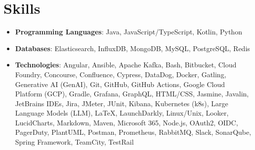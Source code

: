 \documentclass[letterpaper,10pt]{article}
\newcommand{\skills}[2]{\item\small{{\textbf{#1}: #2\vspace{-6pt}}}}
\begin{document}
\section{Skills}
\begin{itemize}[leftmargin=6pt, rightmargin=8pt, label={}]
  \skills{Programming Languages}
    {Java, JavaScript/TypeScript, Kotlin, Python}
  \skills{Databases}
    {Elasticsearch, InfluxDB, MongoDB, MySQL, PostgreSQL, Redis}
  \skills{Technologies}
    {Angular, Ansible, Apache Kafka, Bash, Bitbucket, Cloud Foundry, Concourse, Confluence, Cypress, DataDog, Docker, Gatling, Generative AI (GenAI), Git, GitHub, GitHub Actions, Google Cloud Platform (GCP), Gradle, Grafana, GraphQL, HTML/CSS, Jasmine, Javalin, JetBrains IDEs, Jira, JMeter, JUnit, Kibana, Kubernetes (k8s), Large Language Models (LLM), LaTeX, LaunchDarkly, Linux/Unix, Looker, LucidCharts, Markdown, Maven, Microsoft 365, Node.js, OAuth2, OIDC, PagerDuty, PlantUML, Postman, Prometheus, RabbitMQ, Slack, SonarQube, Spring Framework, TeamCity, TestRail}
\end{itemize}
\end{document}
